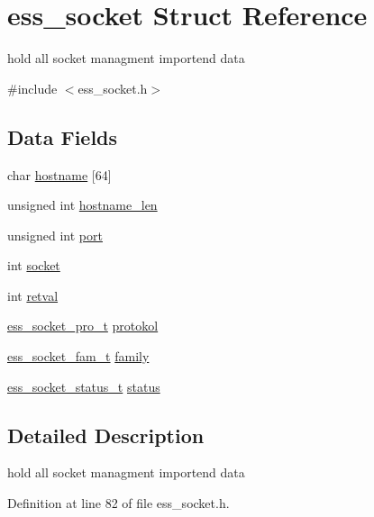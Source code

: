 \hypertarget{structess__socket}{}\section{ess\+\_\+socket Struct Reference}
\label{structess__socket}


hold all socket managment importend data  




{\ttfamily \#include $<$ess\+\_\+socket.\+h$>$}

\subsection*{Data Fields}
\begin{DoxyCompactItemize}
\item 
char \hyperlink{structess__socket_a0c6be700c8763c26054098348ebef8d6}{hostname} \mbox{[}64\mbox{]}
\item 
unsigned int \hyperlink{structess__socket_a4d0d74743d167680649419163ce8c80e}{hostname\+\_\+len}
\item 
unsigned int \hyperlink{structess__socket_a938bdc6ae46c346147b6d4f67ad1e704}{port}
\item 
int \hyperlink{structess__socket_a3666576f6b88007cc7b8f26c7da596c8}{socket}
\item 
int \hyperlink{structess__socket_a7f345697df7eb20c9aba1ab6980cae8f}{retval}
\item 
\hyperlink{ess__socket_8h_a1e8e8de805f8e0b7da25e3b177977273}{ess\+\_\+socket\+\_\+pro\+\_\+t} \hyperlink{structess__socket_a1f0429596710512357072b192ba3d2bd}{protokol}
\item 
\hyperlink{ess__socket_8h_a9305eae437d57846661e997bb755d150}{ess\+\_\+socket\+\_\+fam\+\_\+t} \hyperlink{structess__socket_ad09623d57ebd33fef8dac4e18c0cba2f}{family}
\item 
\hyperlink{ess__socket_8h_ae3a6dc482fc34f9ea0361820ba4be573}{ess\+\_\+socket\+\_\+status\+\_\+t} \hyperlink{structess__socket_a4e47521e8af756b9edf77f1f02f9b725}{status}
\end{DoxyCompactItemize}


\subsection{Detailed Description}
hold all socket managment importend data 

Definition at line 82 of file ess\+\_\+socket.\+h.



